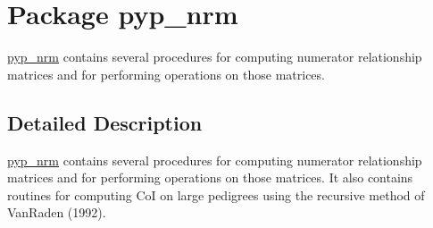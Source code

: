 \hypertarget{namespacepyp__nrm}{
\section{Package pyp\_\-nrm}
\label{namespacepyp__nrm}
}


\hyperlink{namespacepyp__nrm}{pyp\_\-nrm} contains several procedures for computing numerator relationship matrices and for performing operations on those matrices.  




\subsection{Detailed Description}
\hyperlink{namespacepyp__nrm}{pyp\_\-nrm} contains several procedures for computing numerator relationship matrices and for performing operations on those matrices. It also contains routines for computing CoI on large pedigrees using the recursive method of VanRaden (1992). 